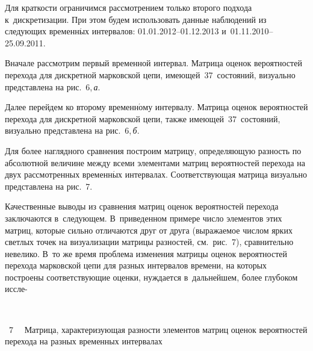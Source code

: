 \begin{multicols}{2}
  Для краткости ограничимся рассмотрением только второго подхода 
  к~дискретизации. При этом будем использовать данные наблюдений из 
сле\-ду\-ющих временн$\acute{\mbox{ы}}$х интервалов: 01.01.2012--01.12.2013  
и~01.11.2010--25.09.2011.
  
  Вначале рассмотрим первый временной интервал. Матрица оценок 
вероятностей перехода для дискретной марковской цепи,  
име\-ющей~37~состояний, визуально представлена на рис.~6,\,\textit{а}.


  
  Далее перейдем ко второму временн$\acute{\mbox{о}}$му интервалу. 
Матрица оценок вероятностей перехода для дискретной марковской цепи, 
также име\-ющей~37~состояний, визуально представлена на рис.~6,\,\textit{б}.




  
  Для более наглядного сравнения построим мат\-ри\-цу, определяющую разность 
по абсолютной величине между всеми элементами матриц вероятностей 
перехода на двух рассмотренных временн$\acute{\mbox{ы}}$х интервалах. 
Соответствующая матрица визуально представлена на рис.~7.
  

  
  Качественные выводы из сравнения матриц оценок вероятностей перехода 
заключаются в~следующем. В~приведенном примере число элементов этих 
матриц, которые сильно отличаются друг от друга (выражаемое числом ярких 
светлых точек на визуализации матрицы разностей, см.\ рис.~7), сравнительно невелико. 
В~то же время проблема изменения матрицы оценок вероятностей перехода 
марковской цепи для разных интервалов времени, на которых построены 
соответствующие оценки, нуждается в~дальнейшем, более глубоком 
иссле-\linebreak\vspace*{-12pt}

{ \begin{center}  %
 \vspace*{-4pt}
    \mbox{%
\epsfxsize=75.89mm
}
\end{center}

\vspace*{-3pt}

\noindent
{{\figurename~7}\ \ \small{
Матрица, характеризующая разности элементов матриц оценок вероятностей перехода 
на разных временных интервалах 
}}}

\vspace*{9pt}

\addtocounter{figure}{1}


\end{multicols}
